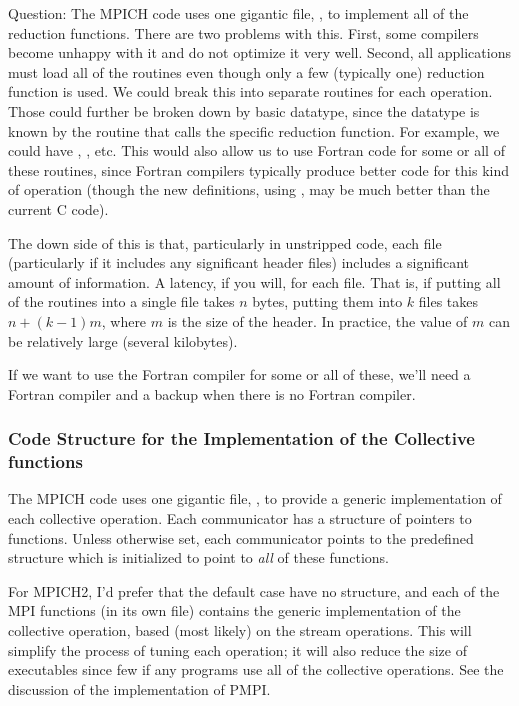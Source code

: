 \documentclass{article}
\begin{document}
Question:
The MPICH code uses one gigantic file, , to implement
all of the reduction functions.  There are two problems with this.
First, some compilers become unhappy with it and do not optimize it
very well.  Second, all applications must load all of the routines
even though only a few (typically one) reduction function is used.  We
could break this into separate routines for each operation.  Those
could further be broken down by basic datatype, since the datatype is
known by the routine that calls the specific reduction function.  
For example, we could have ,
, etc.  This would also allow us to use Fortran
code for some or all of these routines, since Fortran compilers
typically produce better code for this kind of operation (though the
new definitions, using , may be much better than the
current C code).

The down side of this is that, particularly in unstripped code, each
file (particularly if it includes any significant header files)
includes a significant amount of information.  A latency, if you will,
for each file.  That is, if putting all of the routines into a single
file takes $n$ bytes, putting them into $k$ files takes $n + (k-1)m$,
where $m$ is the size of the header.  In practice, the value of $m$ can be
relatively large (several kilobytes).

If we want to use the Fortran compiler for some or all of these, we'll
need a Fortran compiler and a backup when there is no Fortran compiler.

\subsubsection{Code Structure for the Implementation of the Collective
  functions} 

The MPICH code uses one gigantic file, , to provide a
generic implementation of each collective operation.  Each
communicator has a structure of pointers to functions.  Unless
otherwise set, each communicator points to the predefined structure
 which is
initialized to point to \emph{all} of 
these functions.  

For MPICH2, I'd prefer that the default case have no structure, and
each of the MPI functions (in its own file) contains the generic
implementation of the collective operation, based (most likely) on the
stream operations.  This will simplify the process of tuning each
operation; it will also reduce the size of executables since few if
any programs use all of the collective operations.
See the discussion of the implementation of PMPI.
\end{document}
